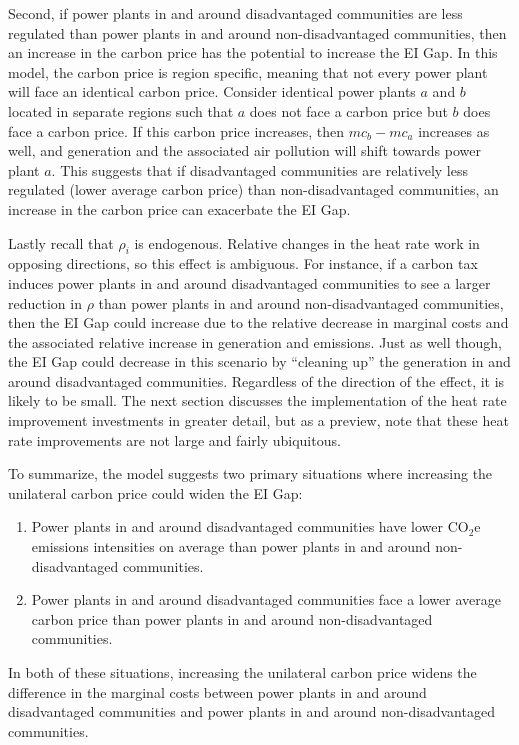 Second, if power plants in and around disadvantaged communities are less regulated than power plants in and around non-disadvantaged communities, then an increase in the carbon price has the potential to increase the EI Gap. In this model, the carbon price is region specific, meaning that not every power plant will face an identical carbon price. Consider identical power plants $a$ and $b$ located in separate regions such that $a$ does not face a carbon price but $b$ does face a carbon price. If this carbon price increases, then $mc_{b} - mc_a$ increases as well, and generation and the associated air pollution will shift towards power plant $a$. This suggests that if disadvantaged communities are relatively less regulated (lower average carbon price) than non-disadvantaged communities, an increase in the carbon price can exacerbate the EI Gap.

Lastly recall that $\rho_i$ is endogenous. Relative changes in the heat rate work in opposing directions, so this effect is ambiguous. For instance, if a carbon tax induces power plants in and around disadvantaged communities to see a larger reduction in $\rho$ than power plants in and around non-disadvantaged communities, then the EI Gap could increase due to the relative decrease in marginal costs and the associated relative increase in generation and emissions. Just as well though, the EI Gap could decrease in this scenario by ``cleaning up'' the generation in and around disadvantaged communities. Regardless of the direction of the effect, it is likely to be small. The next section discusses the implementation of the heat rate improvement investments in greater detail, but as a preview, note that these heat rate improvements are not large and fairly ubiquitous. 

To summarize, the model suggests two primary situations where increasing the unilateral carbon price could widen the EI Gap:
\begin{enumerate}
    \item Power plants in and around disadvantaged communities have lower CO$_2$e emissions intensities on average than power plants in and around non-disadvantaged communities.
    \item Power plants in and around disadvantaged communities face a lower average carbon price than power plants in and around non-disadvantaged communities. 
\end{enumerate}
In both of these situations, increasing the unilateral carbon price widens the difference in the marginal costs between power plants in and around disadvantaged communities and power plants in and around non-disadvantaged communities. 


